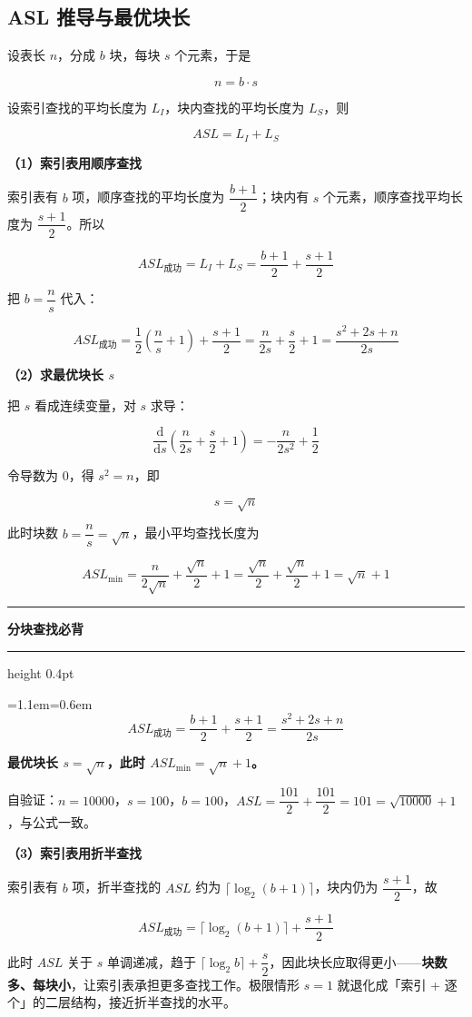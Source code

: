 \documentclass[11pt,openany,UTF8]{ctexbook}
\newcommand{\callouthead}[2]{%
  \par\addvspace{7pt}\noindent
  {\color{#1}\rule[-0.15em]{3pt}{1.05em}}\hspace{0.5em}%
  {\bfseries\color{#1}#2}\par\nobreak\vspace{-0.35em}%
  {\color{rulesep}\hrule height 0.4pt}\nobreak\vspace{0.45em}%
  \begingroup\small\setlength{\parindent}{0pt}%
  \leftskip=1.1em\rightskip=0.6em\noindent\ignorespaces}
\newcommand{\calloutend}{\par\endgroup\addvspace{7pt}}
\newenvironment{callkey}[1]{\callouthead{keybar}{#1}}{\calloutend}
\begin{document}
\subsection{ASL 推导与最优块长}

设表长 $n$，分成 $b$ 块，每块 $s$ 个元素，于是

\[n=b\cdot s\]

设索引查找的平均长度为 $L_I$，块内查找的平均长度为 $L_S$，则

\[ASL=L_I+L_S\]

\textbf{（1）索引表用顺序查找}

索引表有 $b$ 项，顺序查找的平均长度为 $\dfrac{b+1}{2}$；块内有 $s$ 个元素，顺序查找平均长度为 $\dfrac{s+1}{2}$。所以

\[ASL_{成功}=L_I+L_S=\frac{b+1}{2}+\frac{s+1}{2}\]

把 $b=\dfrac{n}{s}$ 代入：

\[ASL_{成功}=\frac{1}{2}\left(\frac{n}{s}+1\right)+\frac{s+1}{2}=\frac{n}{2s}+\frac{s}{2}+1=\frac{s^{2}+2s+n}{2s}\]

\textbf{（2）求最优块长 $s$}

把 $s$ 看成连续变量，对 $s$ 求导：

\[\frac{\mathrm{d}}{\mathrm{d}s}\left(\frac{n}{2s}+\frac{s}{2}+1\right)=-\frac{n}{2s^{2}}+\frac{1}{2}\]

令导数为 0，得 $s^{2}=n$，即

\[\boxed{s=\sqrt{n}}\]

此时块数 $b=\dfrac{n}{s}=\sqrt{n}$，最小平均查找长度为

\[ASL_{\min}=\frac{n}{2\sqrt{n}}+\frac{\sqrt{n}}{2}+1=\frac{\sqrt{n}}{2}+\frac{\sqrt{n}}{2}+1=\sqrt{n}+1\]

\begin{callkey}{分块查找必背}
\[ASL_{成功}=\frac{b+1}{2}+\frac{s+1}{2}=\frac{s^{2}+2s+n}{2s}\]

\textbf{最优块长 $s=\sqrt{n}$，此时 $ASL_{\min}=\sqrt{n}+1$。}

自验证：$n=10000$，$s=100$，$b=100$，$ASL=\dfrac{101}{2}+\dfrac{101}{2}=101=\sqrt{10000}+1$，与公式一致。

\end{callkey}

\textbf{（3）索引表用折半查找}

索引表有 $b$ 项，折半查找的 $ASL$ 约为 $\lceil \log_2(b+1)\rceil$，块内仍为 $\dfrac{s+1}{2}$，故

\[ASL_{成功}=\lceil \log_2(b+1)\rceil+\frac{s+1}{2}\]

此时 $ASL$ 关于 $s$ 单调递减，趋于 $\lceil \log_2 b\rceil+\dfrac{s}{2}$，因此块长应取得更小——\textbf{块数多、每块小}，让索引表承担更多查找工作。极限情形 $s=1$ 就退化成「索引 + 逐个」的二层结构，接近折半查找的水平。
\end{document}
